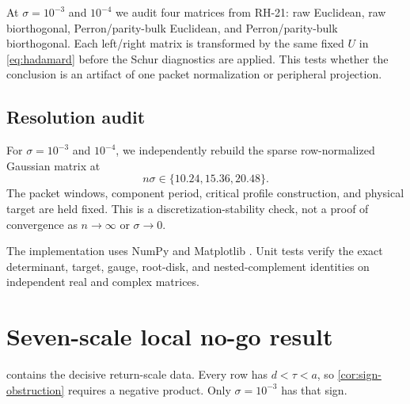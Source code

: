 \documentclass[11pt]{article}
\theoremstyle{definition}
\theoremstyle{remark}
\begin{document}
At $\sigma=10^{-3}$ and $10^{-4}$ we audit four matrices from RH-21:
raw Euclidean, raw biorthogonal, Perron/parity-bulk Euclidean, and
Perron/parity-bulk biorthogonal.  Each left/right matrix is transformed by
the same fixed $U$ in \eqref{eq:hadamard} before the Schur diagnostics are
applied.  This tests whether the conclusion is an artifact of one packet
normalization or peripheral projection.

\subsection{Resolution audit}

For $\sigma=10^{-3}$ and $10^{-4}$, we independently rebuild the sparse
row-normalized Gaussian matrix at
\begin{equation}\label{eq:grid-densities}
 n\sigma\in\{10.24,15.36,20.48\}.
\end{equation}
The packet windows, component period, critical profile construction, and
physical target are held fixed.  This is a discretization-stability check,
not a proof of convergence as $n\to\infty$ or $\sigma\to0$.

The implementation uses NumPy and Matplotlib
\citep{HarrisEtAl2020,Hunter2007}.  Unit tests verify the exact determinant,
target, gauge, root-disk, and nested-complement identities on independent
real and complex matrices.

\section{Seven-scale local no-go result}
\label{sec:seven-scale}

 contains the decisive return-scale data.
Every row has $d<\tau<a$, so \cref{cor:sign-obstruction} requires a negative
product.  Only $\sigma=10^{-3}$ has that sign.
\end{document}
